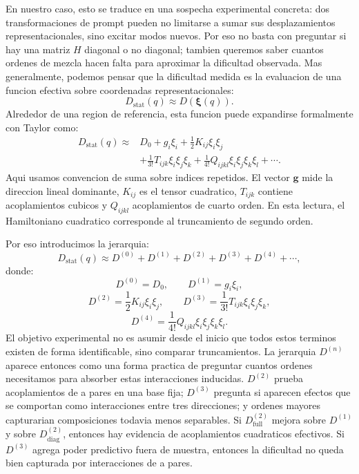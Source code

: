 ﻿\documentclass[10pt,twocolumn]{article}
\newcommand{\xrep}{\bm{\xi}}
\begin{document}
En nuestro caso, esto se traduce en una sospecha experimental concreta: dos transformaciones de prompt pueden no limitarse a sumar sus desplazamientos representacionales, sino excitar modos nuevos. Por eso no basta con preguntar si hay una matriz \(H\) diagonal o no diagonal; tambien queremos saber cuantos ordenes de mezcla hacen falta para aproximar la dificultad observada. Mas generalmente, podemos pensar que la dificultad medida es la evaluacion de una funcion efectiva sobre coordenadas representacionales:
\[
D_{\mathrm{stat}}(q)
\approx
D(\xrep(q)).
\]
Alrededor de una region de referencia, esta funcion puede expandirse formalmente con Taylor como:
\[
\begin{aligned}
D_{\mathrm{stat}}(q)
\approx{}&
D_0
+g_i\xi_i
+\frac{1}{2}K_{ij}\xi_i\xi_j\\
&+\frac{1}{3!}T_{ijk}\xi_i\xi_j\xi_k
+\frac{1}{4!}Q_{ijkl}\xi_i\xi_j\xi_k\xi_l
+\cdots .
\end{aligned}
\]
Aqui usamos convencion de suma sobre indices repetidos. El vector \(\bm{g}\) mide la direccion lineal dominante, \(K_{ij}\) es el tensor cuadratico, \(T_{ijk}\) contiene acoplamientos cubicos y \(Q_{ijkl}\) acoplamientos de cuarto orden. En esta lectura, el Hamiltoniano cuadratico corresponde al truncamiento de segundo orden.

Por eso introducimos la jerarquia:
\[
D_{\mathrm{stat}}(q)
\approx
D^{(0)}+D^{(1)}+D^{(2)}+D^{(3)}+D^{(4)}+\cdots,
\]
donde:
\[
D^{(0)}=D_0,
\qquad
D^{(1)}=g_i\xi_i,
\]
\[
D^{(2)}=\frac{1}{2}K_{ij}\xi_i\xi_j,
\qquad
D^{(3)}=\frac{1}{3!}T_{ijk}\xi_i\xi_j\xi_k,
\]
\[
D^{(4)}=\frac{1}{4!}Q_{ijkl}\xi_i\xi_j\xi_k\xi_l.
\]
El objetivo experimental no es asumir desde el inicio que todos estos terminos existen de forma identificable, sino comparar truncamientos. La jerarquia \(D^{(n)}\) aparece entonces como una forma practica de preguntar cuantos ordenes necesitamos para absorber estas interacciones inducidas. \(D^{(2)}\) prueba acoplamientos de a pares en una base fija; \(D^{(3)}\) pregunta si aparecen efectos que se comportan como interacciones entre tres direcciones; y ordenes mayores capturarian composiciones todavia menos separables. Si \(D^{(2)}_{\mathrm{full}}\) mejora sobre \(D^{(1)}\) y sobre \(D^{(2)}_{\mathrm{diag}}\), entonces hay evidencia de acoplamientos cuadraticos efectivos. Si \(D^{(3)}\) agrega poder predictivo fuera de muestra, entonces la dificultad no queda bien capturada por interacciones de a pares.
\end{document}
